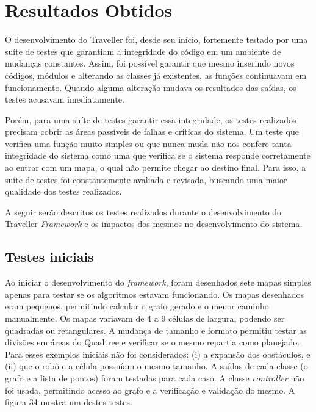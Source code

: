 \chapter[Resultados obtidos]{Resultados Obtidos}

O desenvolvimento do Traveller foi, desde seu início, fortemente testado por uma suíte de testes que garantiam a integridade do código em um ambiente de mudanças constantes. Assim, foi possível garantir que mesmo inserindo novos códigos, módulos e alterando as classes já existentes, as funções continuavam em funcionamento. Quando alguma alteração mudava os resultados das saídas, os testes acusavam imediatamente.

Porém, para uma suíte de testes garantir essa integridade, os testes realizados precisam cobrir as áreas passíveis de falhas e críticas do sistema. Um teste que verifica uma função muito simples ou que nunca muda não nos confere tanta integridade do sistema como uma que verifica se o sistema responde corretamente ao entrar com um mapa, o qual não permite chegar ao destino final. Para isso, a suíte de testes foi constantemente avaliada e revisada, buscando uma maior qualidade dos testes realizados.

A seguir serão descritos os testes realizados durante o desenvolvimento do Traveller \textit{Framework} e os impactos dos mesmos no desenvolvimento do sistema.

\section{Testes iniciais}

Ao iniciar o desenvolvimento do \textit{framework}, foram desenhados sete mapas simples apenas para testar se os algoritmos estavam funcionando. Os mapas desenhados eram pequenos, permitindo calcular o grafo gerado e o menor caminho manualmente. Os mapas variavam  de 4 a 9 células de largura, podendo ser quadradas ou retangulares. A mudança de tamanho e formato permitiu testar as divisões em áreas do Quadtree e verificar se o mesmo repartia como planejado. Para esses exemplos iniciais não foi considerados: (i) a expansão dos obstáculos, e (ii) que o robô e a célula possuíam o mesmo tamanho. A saídas de cada classe (o grafo e a lista de pontos) foram testadas para cada caso. A classe \textit{controller} não foi usada, permitindo acesso ao grafo e a verificação e validação do mesmo. A figura 34 mostra um destes testes.

